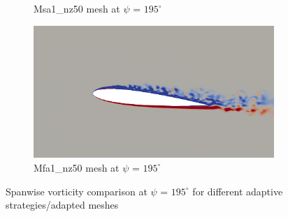 \begin{figure}[H]
\begin{subfigure}[b]{0.475\textwidth}
\caption{Msa1\_nz50 mesh at $\psi$ = $195^\circ$}
\label{fig:hadapt_psi195}
\end{subfigure}
\begin{subfigure}[b]{0.475\textwidth}
\centering
\includegraphics[width=1\textwidth]{figures/adapt_strat/vorticity_plots/Mfa1_50/phase_195.png}
\caption{Mfa1\_nz50 mesh at $\psi$ = $195^\circ$}
\label{fig:FB_psi195}
\end{subfigure}
\caption{Spanwise vorticity comparison at $\psi$ = $195^\circ$ for different adaptive strategies/adapted meshes}
\label{fig:vorticity_195}
\end{figure}



